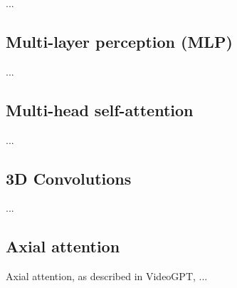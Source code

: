 ...





\subsection{Multi-layer perception (MLP)}

...








\subsection{Multi-head self-attention}

...






\subsection{3D Convolutions}
\label{appendix:blocks_3dconv}

...




\subsection{Axial attention}
\label{appendix:blocks_axial_attention}

Axial attention, as described in VideoGPT, ...